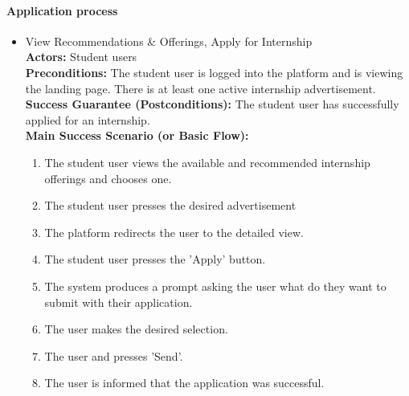 \paragraph{Application process}

\begin{itemize}[label={[\textbf{UC}]}, align=left, leftmargin=*]
    \item {} View Recommendations \& Offerings, Apply for Internship \\
     \textbf{Actors:} Student users\\
     \textbf{Preconditions:} The student user is logged into the platform and is viewing the landing page. There is at least one active internship advertisement.\\
     \textbf{Success Guarantee (Postconditions):} The student user has successfully applied for an internship. \\
     \textbf{Main Success Scenario (or Basic Flow):} 
     \begin{enumerate}[label=\arabic*.] 
        \item The student user views the available and recommended internship offerings and chooses one.
        \item The student user presses the desired advertisement 
        \item The platform redirects the user to the detailed view.
        \item The student user presses the 'Apply' button.
        \item The system produces a prompt asking the user what do they want to submit with their application.
        \item The user makes the desired selection.
        \item The user and presses 'Send'.
        \item The user is informed that the application was successful.
     \end{enumerate} \\


\end{itemize}
